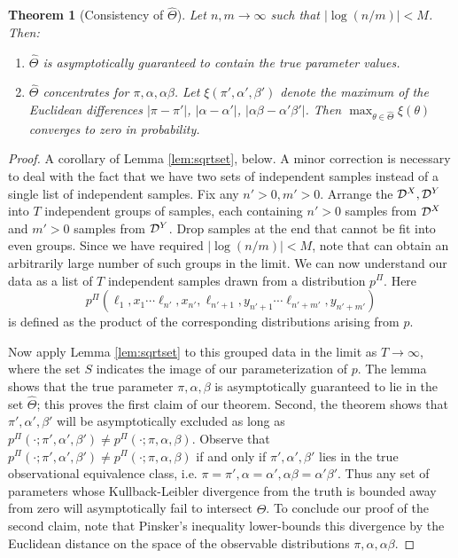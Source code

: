 \documentclass{article}
\newtheorem*{thm*}{Theorem}
\theoremstyle{definition}
\begin{document}
\begin{thm*}[Consistency of $\hat \Theta$] Let $n,m\rightarrow\infty$ such that $|\log(n/m)|<M$.  Then:
\begin{enumerate}
    \item $\hat \Theta$ is asymptotically guaranteed to contain the true parameter values.  
    \item $\hat \Theta$ concentrates for $\pi,\alpha,\alpha\beta$. Let $\xi(\pi',\alpha',\beta')$ denote the maximum of the Euclidean differences $|\pi-\pi'|$, $|\alpha-\alpha'|$, $|\alpha\beta-\alpha'\beta'|$.  Then $\max_{\theta \in \hat \Theta} \xi(\theta)$ converges to zero in probability.   
\end{enumerate}
\end{thm*}
\begin{proof} A corollary of Lemma \ref{lem:sqrtset}, below.  A minor correction is necessary to deal with the fact that we have two sets of independent samples instead of a single list of independent samples.  Fix any $n'>0,m'>0$.  Arrange the $\mathcal{D}^X,\mathcal{D}^Y$ into $T$ independent groups of samples, each containing $n'>0$ samples from $\mathcal{D}^X$ and $m'>0$ samples from $\mathcal{D}^Y$.  Drop samples at the end that cannot be fit into even groups.  Since we have required $|\log(n/m)|<M$, note that can obtain an arbitrarily large number of such groups in the limit.  We can now understand our data as a list of $T$ independent samples drawn from a distribution $p^\Pi$.  Here 
\[
p^\Pi(\ell_1,x_1\cdots \ell_{n'},x_{n'},\ell_{n'+1},y_{n'+1}\cdots \ell_{n'+m'},y_{n'+m'})
\]
is defined as the product of the corresponding distributions arising from $p$.

Now apply Lemma \ref{lem:sqrtset} to this grouped data in the limit as $T\rightarrow \infty$, where the set $S$ indicates the image of our parameterization of $p$. The lemma shows that the true parameter $\pi,\alpha,\beta$ is asymptotically guaranteed to lie in the set $\hat \Theta$; this proves the first claim of our theorem.  Second, the theorem shows that $\pi',\alpha',\beta'$ will be asymptotically excluded as long as $p^\Pi(\cdot; \pi',\alpha',\beta') \neq p^\Pi(\cdot; \pi,\alpha,\beta)$.  Observe that $p^\Pi(\cdot; \pi',\alpha',\beta') \neq p^\Pi(\cdot; \pi,\alpha,\beta)$ if and only if $\pi',\alpha',\beta'$ lies in the true observational equivalence class, i.e. $\pi=\pi',\alpha=\alpha',\alpha\beta=\alpha'\beta'$. Thus any set of parameters whose Kullback-Leibler divergence from the truth is bounded away from zero will asymptotically fail to intersect $\hat \Theta$.  To conclude our proof of the second claim, note that Pinsker's inequality lower-bounds this divergence by the Euclidean distance on the space of the observable distributions $\pi,\alpha,\alpha\beta$.
\end{proof}
\end{document}

